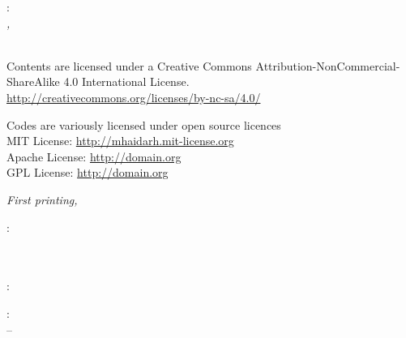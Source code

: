 

\thispagestyle{empty}

\hfill

\vfill

\noindent\myName:\\
\textit{\myTitle,}\\
\textcopyright\ \myTime

\bigskip

\noindent Contents are licensed under a Creative Commons Attribution-NonCommercial-ShareAlike 4.0 International License.\\
\url{http://creativecommons.org/licenses/by-nc-sa/4.0/}

\medskip

\noindent Codes are variously licensed under open source licences\\
MIT License: \url{http://mhaidarh.mit-license.org}\\
Apache License: \url{http://domain.org}\\
GPL License: \url{http://domain.org}\\

\bigskip

\noindent \textit{First printing, \myDatePrint}

\bigskip

\noindent{}: \\
\mySupervisor \\
\myExaminerA \\
\myExaminerB

\medskip

\noindent{}: \\
\myLocation

\medskip

\noindent{}: \\
\myMonthFirst \xspace \myYearFirst \xspace -- \myMonthLast \xspace \myYearLast
